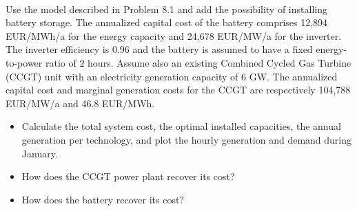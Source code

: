 \documentclass[10pt]{article}
\newenvironment{problem}[2][Problem]{\begin{trivlist}
\item[\hskip \labelsep {\bfseries #1}\hskip \labelsep {\bfseries #2.}]}{\end{trivlist}}
\begin{document}
\

\begin{problem}{8.2}
Use the model described in Problem 8.1 and add the possibility of installing battery storage. The annualized capital cost of the battery comprises  12,894 EUR/MWh/a for the energy capacity and 24,678 EUR/MW/a for the inverter. The inverter efficiency is 0.96 and the battery is assumed to have a fixed energy-to-power ratio of 2 hours. Assume also an existing Combined Cycled Gas Turbine (CCGT) unit with an electricity generation capacity of 6 GW. The annualized capital cost and marginal generation costs for the CCGT are respectively 104,788 EUR/MW/a and 46.8 EUR/MWh.

\begin{itemize}
\item[a)] Calculate the total system cost, the optimal installed capacities, the annual generation per technology, and plot the hourly generation and demand during January.

\item[b)] How does the CCGT power plant recover its cost?

\item[c)] How does the battery recover its cost?

\end{itemize}

\end{problem}



\end{document}
